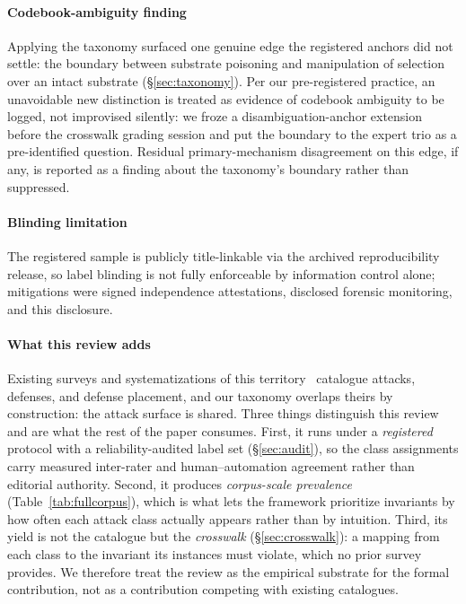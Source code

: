\documentclass[conference]{IEEEtran}
\begin{document}
\paragraph*{Codebook-ambiguity finding}
Applying the taxonomy surfaced one genuine edge the registered
anchors did not settle: the boundary between substrate poisoning
and manipulation of selection over an intact substrate
(\S\ref{sec:taxonomy}). Per our pre-registered practice, an
unavoidable new distinction is treated as evidence of codebook
ambiguity to be logged, not improvised silently: we froze a
disambiguation-anchor extension before the crosswalk grading
session and put the boundary to the expert trio as a
pre-identified question. Residual
primary-mechanism disagreement on this edge, if any, is reported
as a finding about the taxonomy's boundary rather than suppressed.

\paragraph*{Blinding limitation}
The registered sample is publicly title-linkable via the archived
reproducibility release, so label blinding is not fully
enforceable by information control alone; mitigations were signed
independence attestations, disclosed forensic monitoring, and this
disclosure.

\paragraph*{What this review adds}
Existing surveys and systematizations of this
territory~\cite{oob,tracessurvey,owaspmcp} catalogue attacks,
defenses, and defense placement, and our taxonomy overlaps theirs
by construction: the attack surface is shared. Three things
distinguish this review and are what the rest of the paper
consumes. First, it runs under a \emph{registered} protocol with a
reliability-audited label set (\S\ref{sec:audit}), so the class
assignments carry measured inter-rater and human--automation
agreement rather than editorial authority. Second, it produces
\emph{corpus-scale prevalence} (Table~\ref{tab:fullcorpus}), which
is what lets the framework prioritize invariants by how often each
attack class actually appears rather than by intuition. Third, its
yield is not the catalogue but the \emph{crosswalk}
(\S\ref{sec:crosswalk}): a mapping from each class to the invariant
its instances must violate, which no prior survey provides. We
therefore treat the review as the empirical substrate for the
formal contribution, not as a contribution competing with existing
catalogues.
\end{document}
